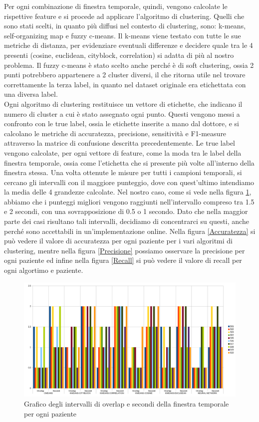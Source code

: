 Per ogni combinazione di finestra temporale, quindi, vengono calcolate le rispettive feature e si procede ad applicare l'algoritmo di clustering. Quelli che sono stati scelti, in quanto più diffusi nel contesto di clustering, sono: k-means, self-organizing map e fuzzy c-means. Il k-means viene testato con tutte le sue metriche di distanza, per evidenziare eventuali differenze e decidere quale tra le 4 presenti (cosine, euclidean, cityblock, correlation) si adatta di più al nostro problema. Il fuzzy c-means è stato scelto anche perché è di soft clustering, ossia 2 punti potrebbero appartenere a 2 cluster diversi, il che ritorna utile nel trovare correttamente la terza label, in quanto nel dataset originale era etichettata con una diversa label.\\
Ogni algoritmo di clustering restituisce un vettore di etichette, che indicano il numero di cluster a cui è stato assegnato ogni punto. Questi vengono messi a confronto con le true label, ossia le etichette inserite a mano dal dottore, e si calcolano le metriche di accuratezza, precisione, sensitività e F1-measure attraverso la matrice di confusione descritta precedentemente. Le true label vengono calcolate, per ogni vettore di feature, come la moda tra le label della finestra temporale, ossia come l'etichetta che si presente più volte all'interno della finestra stessa. Una volta ottenute le misure per tutti i campioni temporali, si cercano gli intervalli con il maggiore punteggio, dove con quest'ultimo intendiamo la media delle 4 grandezze calcolate. Nel nostro caso, come si vede nella figura \ref{SecondiOverlap}, abbiamo che i punteggi migliori vengono raggiunti nell'intervallo compreso tra 1.5 e 2 secondi, con una sovrapposizione di 0.5 o 1 secondo. Dato che nella maggior parte dei casi risultano tali intervalli, decidiamo di concentrarci su questi, anche perché sono accettabili in un'implementazione online. Nella figura \ref{Accuratezza} si può vedere il valore di accuratezza per ogni paziente per i vari algoritmi di clustering, mentre nella figura \ref{Precisione} possiamo osservare la precisione per ogni paziente ed infine nella figura \ref{Recall} si può vedere il valore di recall per ogni algortimo e paziente.
\begin{figure}[]
	\centering
	\includegraphics[scale=0.35]{images/secondi_overlap.png}
	\caption{Grafico degli intervalli di overlap e secondi della finestra temporale per ogni paziente}
	\label{SecondiOverlap}
\end{figure}

